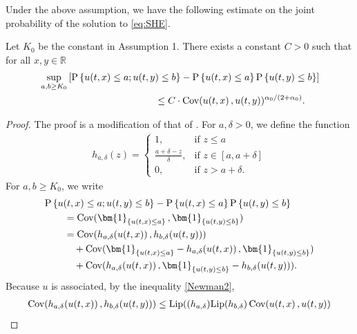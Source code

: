 \documentclass[12pt, reqno]{amsart}
\newcommand{\R}{{\mathbb{R}}}
\renewcommand{\P}{\mathrm{P}}
\newcommand{\<}{\langle}
\renewcommand{\>}{\rangle}
\newcommand{\lip}{\text{\rm Lip}}
\DeclareMathOperator{\Cov}{\text{\rm Cov}}
\begin{document}
Under the above assumption, we have the following estimate on the joint probability of the solution to \eqref{eq:SHE}.
\begin{lemma} 
            Let $K_0$ be the constant in  Assumption 1.
           There exists a constant $C>0$ such that for all $x,y \in \R$
           \begin{align}\label{eq:joint}
           &\sup_{a, b\geq K_0}\left[ \P\left\{u(t,x) \leq a; u(t,y)\leq b\right\}-  
           \P\left\{u(t,x) \leq a\right\} \P\left\{ u(t,y)\leq b\right\}\right] \nonumber \\
           &
           \qquad\qquad \qquad \qquad \qquad \qquad
           \leq C\cdot\Cov(u(t,x)\,, u(t,y))^{\alpha_0/(2+\alpha_0)}.
           \end{align}
\end{lemma}
\begin{proof}
           The proof is a modification of that of \cite[Theorem 6.2.15]{PR12}.  
                      For $a, \delta>0$, we define the function
           \begin{align*}
           h_{a, \delta}(z)=
           \begin{cases}
           1,& \text{if $z \leq a$}\\
           \frac{a+\delta- z}{\delta},& \text{if $z\in [a, a+\delta]$}\\
           0, &\text{if $z>a+\delta$}.
           \end{cases}
           \end{align*}
           For $a, b\geq K_0$, we write
           \begin{align*}
           &\P\left\{u(t,x) \leq a; u(t,y)\leq b\right\}-  
           \P\left\{u(t,x) \leq a\right\} \P\left\{ u(t,y)\leq b\right\}\\
           &\qquad =\Cov(\bm{1}_{\{u(t,x)\leq a\}}\,, \bm{1}_{\{u(t,y)\leq b\}})\\
           &\qquad = \Cov(h_{a, \delta}(u(t,x))\,, h_{b, \delta}(u(t,y))) \\
           &\qquad\quad + 
           \Cov(\bm{1}_{\{u(t,x)\leq a\}} - h_{a, \delta}(u(t,x))\,, \bm{1}_{\{u(t,y)\leq b\}} )\\
           &\qquad \quad +            \Cov(h_{a, \delta}(u(t,x)) \,, \bm{1}_{\{u(t,y)\leq b\}}-h_{b, \delta}(u(t,y)) ).
           \end{align*}
           Because $u$ is associated, by the inequality \eqref{Newman2},
           \begin{align*}
            \Cov(h_{a, \delta}(u(t,x))\,, h_{b, \delta}(u(t,y))) & \leq \lip((h_{a, \delta})\lip(h_{b, \delta}) \Cov(u(t,x)\,, u(t,y))\\

\end{align*}
\end{proof}
\end{document}
